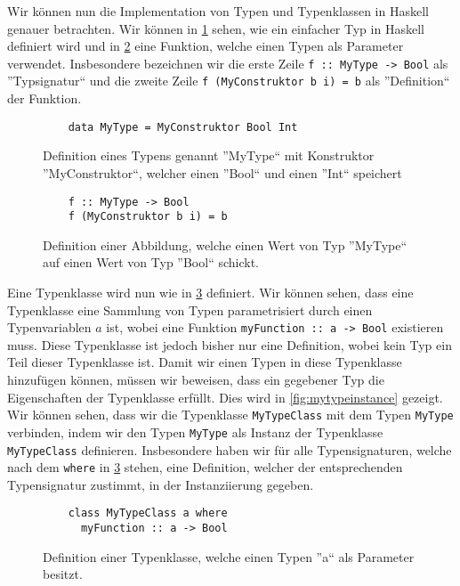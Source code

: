 \documentclass{hhuarticle}
\theoremstyle{definition}
\theoremstyle{theorem}
\begin{document}
  Wir können nun die Implementation von Typen und Typenklassen in Haskell
  genauer betrachten. Wir können in \cref{fig:mytype} sehen, wie ein
  einfacher Typ in Haskell definiert wird und in \cref{fig:myfunction} eine
  Funktion, welche einen Typen als Parameter verwendet. Insbesondere
  bezeichnen wir die erste Zeile \verb|f :: MyType -> Bool| als ''Typsignatur``
  und die zweite Zeile \verb|f (MyConstruktor b i) = b| als ''Definition`` der Funktion.
  
  \begin{figure}[h]
    \begin{lstlisting}
    data MyType = MyConstruktor Bool Int
    \end{lstlisting}
    \caption{Definition eines Typens genannt ''MyType`` mit Konstruktor ''MyConstruktor``, welcher einen ''Bool`` und einen ''Int`` speichert}%
    \label{fig:mytype}
  \end{figure}

  \begin{figure}[h]
    \begin{lstlisting}
    f :: MyType -> Bool
    f (MyConstruktor b i) = b
    \end{lstlisting}
    \caption{Definition einer Abbildung, welche einen Wert von Typ ''MyType`` auf einen Wert von Typ ''Bool`` schickt.}%
    \label{fig:myfunction}
  \end{figure}

  Eine Typenklasse wird nun wie in \cref{fig:mytypeclass} definiert. Wir
  können sehen, dass eine Typenklasse eine Sammlung von Typen
  parametrisiert durch einen Typenvariablen $a$ ist, wobei
  eine Funktion \verb|myFunction :: a -> Bool| existieren muss.
  Diese Typenklasse ist jedoch bisher nur eine Definition, wobei kein
  Typ ein Teil dieser Typenklasse ist. Damit wir einen Typen in diese
  Typenklasse hinzufügen können, müssen wir beweisen, dass ein gegebener
  Typ die Eigenschaften der Typenklasse erfüllt. Dies wird in \cref{fig:mytypeinstance}
  gezeigt. Wir können sehen, dass wir die Typenklasse \verb|MyTypeClass| mit dem Typen
  \verb|MyType| verbinden, indem wir den Typen \verb|MyType| als
  Instanz der Typenklasse \verb|MyTypeClass| definieren.
  Insbesondere haben wir für alle Typensignaturen, welche nach dem \verb|where|
  in \cref{fig:mytypeclass} stehen, eine Definition, welcher der
  entsprechenden Typensignatur zustimmt, in der Instanziierung gegeben.

  \begin{figure}[h]
    \begin{lstlisting}
    class MyTypeClass a where
      myFunction :: a -> Bool
    \end{lstlisting}
    \caption{Definition einer Typenklasse, welche einen Typen ''a`` als Parameter besitzt.}%
    \label{fig:mytypeclass}
  \end{figure}
\end{document}
